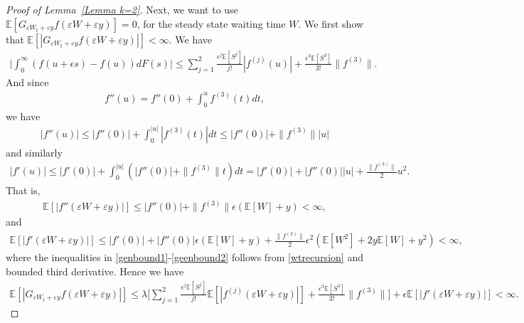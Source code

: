 \documentclass[11pt,letterpaper,reqno]{article}
\theoremstyle{thmstyleone}%
\theoremstyle{thmstyletwo}%
\theoremstyle{thmstylethree}%
\numberwithin{equation}{section}
\begin{document}
\begin{proof}[Proof of Lemma~\ref{Lemma k=2}]
Next, we want to use $ \mathbb E[G_{\varepsilon W_t+\varepsilon y}f(\varepsilon W+\varepsilon y) ]=0$, for the steady state waiting time $W$. We first show that $ \mathbb E[|G_{\varepsilon W_t+\varepsilon y}f(\varepsilon W+\varepsilon y)| ] < \infty$. We have 
\begin{align*}
    \bigg|\int_0^\infty (f(u+\epsilon s)-f(u)) dF(s) \bigg| \leq \sum_{j=1}^2 \frac{\epsilon^j \mathbb E[S^j]}{j!}|f^{(j)}(u)|+\frac{\epsilon^3\mathbb E[S^3]}{3!}\|f^{(3)}\|.
\end{align*}
And since
\begin{align*}
    f''(u)=f''(0)+\int_{0}^{u}f^{(3)}(t)dt,
\end{align*}
we have 
\begin{align*}
    |f''(u)| \leq |f''(0)|+\int_{0}^{|u|}|f^{(3)}(t)|dt \leq |f''(0)| +\|f^{(3)}\||u| 
\end{align*}
and similarly
\begin{align}\label{genbound1}
    |f'(u)| \leq |f'(0)|+\int_0^{|u|} (|f''(0)| +\|f^{(3)}\|t)dt=|f'(0)|+|f''(0)||u|+\frac{\|f^{(3)}\|}{2}u^2.
\end{align}
That is,
\begin{align}\label{geenbound2}
    \mathbb E[|f''(\varepsilon W+\varepsilon y)|] \leq  |f''(0)| +\|f^{(3)}\| \epsilon (\mathbb E[W]+y)< \infty,
\end{align}
and 
\begin{align*}
    \mathbb E[|f'(\varepsilon W+\varepsilon y)|] \leq |f'(0)|+|f''(0)|\epsilon(\mathbb E[W]+y)+\frac{\|f^{(3)}\|}{2}\epsilon^2(\mathbb E[W^2]+2y \mathbb E[W]+y^2)< \infty,
\end{align*}
where the inequalities in \eqref{genbound1}-\eqref{geenbound2} follows from \eqref{wtrecursion} and bounded third derivative.
Hence we have 
\begin{align}\label{genbound3}
    \mathbb E[|G_{\varepsilon W_t+\varepsilon y}f(\varepsilon W+\varepsilon y)| ] \leq \lambda \bigg[ \sum_{j=1}^2 \frac{\epsilon^j \mathbb E[S^j]}{j!}\mathbb E[|f^{(j)}(\varepsilon W+\varepsilon y)|]+\frac{\epsilon^3\mathbb E[S^3]}{3!}\|f^{(3)}\|\bigg] +\epsilon \mathbb E[  |f'(\varepsilon W+\varepsilon y)|]< \infty.
\end{align}


\end{proof}
\end{document}
